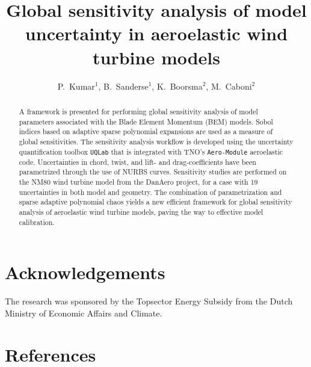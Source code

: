 \documentclass[a4paper]{jpconf}
\newcommand{\myreferences}{../../references,../../Mendeley_refs}
\numberwithin{equation}{section}
\begin{document}



\title{Global sensitivity analysis of model uncertainty in aeroelastic wind turbine models}


\author{P.~Kumar$^{1}$, B.~Sanderse$^{1}$, K.~Boorsma$ ^{2}$, M.~Caboni$^{2}$} 
\address{$^{1}$ Centrum Wiskunde \& Informatica (CWI), Amsterdam, The Netherlands}
\address{$^{2}$ TNO, Westerduinweg 3, Petten, The Netherlands}


\begin{abstract}
A framework is presented for performing global sensitivity analysis of model parameters associated with the Blade Element Momentum (BEM) models.  Sobol indices based on adaptive sparse polynomial expansions are used as a measure of global sensitivities. The sensitivity analysis workflow is developed using the uncertainty quantification toolbox \texttt{UQLab} that is integrated with TNO's \texttt{Aero-Module} aeroelastic code. Uncertainties in chord, twist, and lift- and drag-coefficients have been parametrized through the use of NURBS curves. Sensitivity studies are performed on the NM80 wind turbine model from the DanAero project, for a case with 19 uncertainties in both model and geometry. The combination of parametrization and sparse adaptive polynomial chaos yields a new efficient framework for global sensitivity analysis of aeroelastic wind turbine models, paving the way to effective model calibration. 
\end{abstract}

\vspace{-1cm}




\section*{Acknowledgements}
The research was sponsored by the Topsector Energy Subsidy from the Dutch Ministry of Economic Affairs and Climate.

\section*{References}



%
\end{document}
